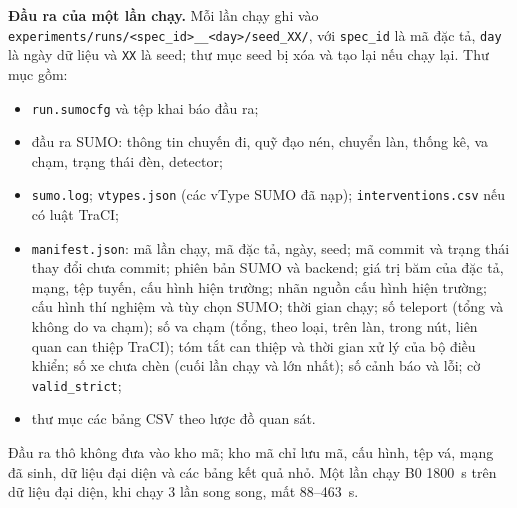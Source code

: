 \documentclass[../DoAn.tex]{subfiles}
\begin{document}
\textbf{Đầu ra của một lần chạy.} Mỗi lần chạy ghi vào \texttt{experiments/\allowbreak runs/\allowbreak <spec\_id>\_\_<day>/\allowbreak seed\_XX/}, với \texttt{spec\_id} là mã đặc tả, \texttt{day} là ngày dữ liệu và \texttt{XX} là seed; thư mục seed bị xóa và tạo lại nếu chạy lại. Thư mục gồm:
\begin{itemize}
    \item \texttt{run.sumocfg} và tệp khai báo đầu ra;
    \item đầu ra SUMO: thông tin chuyến đi, quỹ đạo nén, chuyển làn, thống kê, va chạm, trạng thái đèn, detector;
    \item \texttt{sumo.log}; \texttt{vtypes.json} (các vType SUMO đã nạp); \texttt{interventions.csv} nếu có luật TraCI;
    \item \texttt{manifest.json}: mã lần chạy, mã đặc tả, ngày, seed; mã commit và trạng thái thay đổi chưa commit; phiên bản SUMO và backend; giá trị băm của đặc tả, mạng, tệp tuyến, cấu hình hiện trường; nhãn nguồn cấu hình hiện trường; cấu hình thí nghiệm và tùy chọn SUMO; thời gian chạy; số teleport (tổng và không do va chạm); số va chạm (tổng, theo loại, trên làn, trong nút, liên quan can thiệp TraCI); tóm tắt can thiệp và thời gian xử lý của bộ điều khiển; số xe chưa chèn (cuối lần chạy và lớn nhất); số cảnh báo và lỗi; cờ \texttt{valid\_strict};
    \item thư mục các bảng CSV theo lược đồ quan sát.
\end{itemize}
Đầu ra thô không đưa vào kho mã; kho mã chỉ lưu mã, cấu hình, tệp vá, mạng đã sinh, dữ liệu đại diện và các bảng kết quả nhỏ. Một lần chạy B0 1800~s trên dữ liệu đại diện, khi chạy 3 lần song song, mất 88--463~s.
\end{document}
